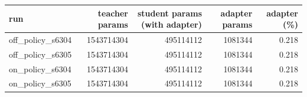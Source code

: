 \begin{tabular}{lrrrr}
\toprule
run & teacher params & student params (with adapter) & adapter params & adapter (\%) \\
\midrule
off\_policy\_s6304 & 1543714304 & 495114112 & 1081344 & 0.218 \\
off\_policy\_s6305 & 1543714304 & 495114112 & 1081344 & 0.218 \\
on\_policy\_s6304 & 1543714304 & 495114112 & 1081344 & 0.218 \\
on\_policy\_s6305 & 1543714304 & 495114112 & 1081344 & 0.218 \\
\bottomrule
\end{tabular}
